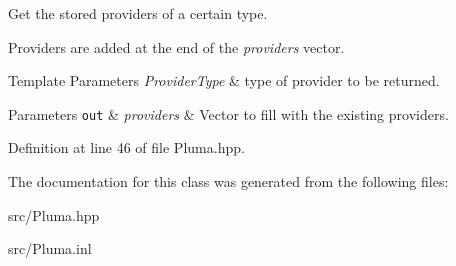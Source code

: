 Get the stored providers of a certain type. 

Providers are added at the end of the {\itshape providers} vector.


\begin{DoxyTemplParams}{Template Parameters}
{\em Provider\+Type} & type of provider to be returned. \\
\hline
\end{DoxyTemplParams}

\begin{DoxyParams}[1]{Parameters}
\mbox{\tt out}  & {\em providers} & Vector to fill with the existing providers. \\
\hline
\end{DoxyParams}


Definition at line 46 of file Pluma.\+hpp.



The documentation for this class was generated from the following files\+:\begin{DoxyCompactItemize}
\item 
src/Pluma.\+hpp\item 
src/Pluma.\+inl\end{DoxyCompactItemize}
